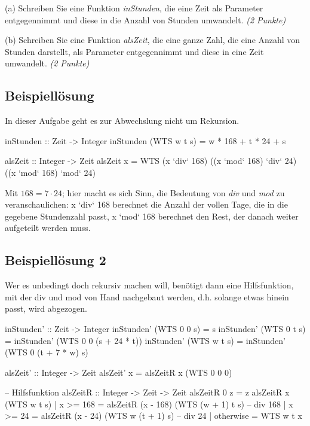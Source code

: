 \documentclass[11pt,a4paper,oneside,ngerman]{scrbook}
\begin{document}
(a) Schreiben Sie eine Funktion \emph{inStunden}, die eine Zeit als Parameter entgegennimmt und diese in die Anzahl von Stunden umwandelt. \emph{(2 Punkte)}

(b) Schreiben Sie eine Funktion \emph{alsZeit}, die eine ganze Zahl, die eine Anzahl von Stunden darstellt, als Parameter entgegennimmt und diese in eine Zeit umwandelt. \emph{(2 Punkte)}


\subsection{Beispiellösung}
In dieser Aufgabe geht es zur Abwechslung nicht um Rekursion.

\begin{code}
  inStunden :: Zeit -> Integer
  inStunden (WTS w t s) = w * 168 + t * 24 + s

  alsZeit :: Integer -> Zeit
  alsZeit x = WTS (x `div` 168) ((x `mod` 168) `div` 24) ((x `mod` 168) `mod` 24)
\end{code}

Mit $168 = 7 \cdot 24$; hier macht es sich Sinn, die Bedeutung von \emph{div} und \emph{mod} zu veranschaulichen: x `div` 168 berechnet die Anzahl der vollen Tage, die in die gegebene Stundenzahl passt, x `mod` 168 berechnet den Rest, der danach weiter aufgeteilt werden muss.

\subsection{Beispiellösung 2}
Wer es unbedingt doch rekursiv machen will, benötigt dann eine Hilfsfunktion, mit der div und mod von Hand nachgebaut werden, d.h. solange etwas hinein passt, wird abgezogen.

\begin{code}
inStunden' :: Zeit -> Integer
inStunden' (WTS 0 0 s) = s
inStunden' (WTS 0 t s) = inStunden' (WTS 0 0 (s + 24 * t))
inStunden' (WTS w t s) = inStunden' (WTS 0 (t + 7 * w) s)

alsZeit' :: Integer -> Zeit
alsZeit' x = alsZeitR x (WTS 0 0 0)

-- Hilfsfunktion
alsZeitR :: Integer -> Zeit -> Zeit
alsZeitR 0 z = z
alsZeitR x (WTS w t s)
       | x >= 168  = alsZeitR (x - 168) (WTS (w + 1) t s) -- div 168
       | x >= 24   = alsZeitR (x - 24) (WTS w (t + 1) s)  -- div 24
       | otherwise = WTS w t x
\end{code}
\end{document}
